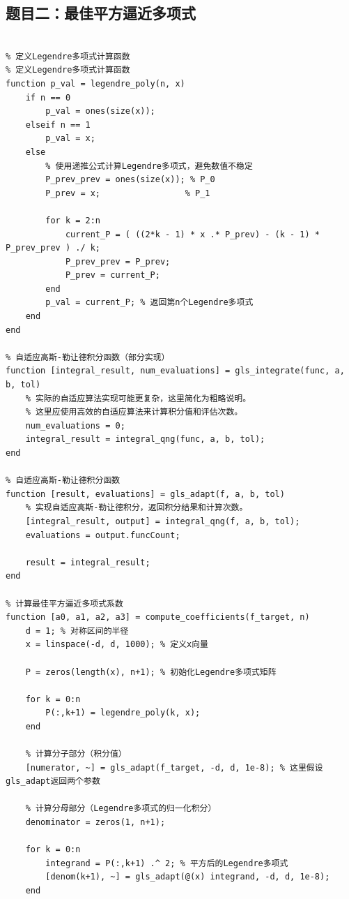 \documentclass[UTF8,a4paper,11pt]{article}
\begin{document}
\subsection{题目二：最佳平方逼近多项式}
\begin{lstlisting}[style=matlab, caption={最佳平方逼近多项式}]

% 定义Legendre多项式计算函数
% 定义Legendre多项式计算函数
function p_val = legendre_poly(n, x)
    if n == 0
        p_val = ones(size(x));
    elseif n == 1
        p_val = x;
    else
        % 使用递推公式计算Legendre多项式，避免数值不稳定
        P_prev_prev = ones(size(x)); % P_0
        P_prev = x;                 % P_1
        
        for k = 2:n
            current_P = ( ((2*k - 1) * x .* P_prev) - (k - 1) * P_prev_prev ) ./ k;
            P_prev_prev = P_prev;
            P_prev = current_P;
        end
        p_val = current_P; % 返回第n个Legendre多项式
    end
end

% 自适应高斯-勒让德积分函数（部分实现）
function [integral_result, num_evaluations] = gls_integrate(func, a, b, tol)
    % 实际的自适应算法实现可能更复杂，这里简化为粗略说明。
    % 这里应使用高效的自适应算法来计算积分值和评估次数。
    num_evaluations = 0;
    integral_result = integral_qng(func, a, b, tol);
end

% 自适应高斯-勒让德积分函数
function [result, evaluations] = gls_adapt(f, a, b, tol)
    % 实现自适应高斯-勒让德积分，返回积分结果和计算次数。
    [integral_result, output] = integral_qng(f, a, b, tol);
    evaluations = output.funcCount;
    
    result = integral_result;
end

% 计算最佳平方逼近多项式系数
function [a0, a1, a2, a3] = compute_coefficients(f_target, n)
    d = 1; % 对称区间的半径
    x = linspace(-d, d, 1000); % 定义x向量
    
    P = zeros(length(x), n+1); % 初始化Legendre多项式矩阵
    
    for k = 0:n
        P(:,k+1) = legendre_poly(k, x);
    end

    % 计算分子部分（积分值）
    [numerator, ~] = gls_adapt(f_target, -d, d, 1e-8); % 这里假设gls_adapt返回两个参数
    
    % 计算分母部分（Legendre多项式的归一化积分）
    denominator = zeros(1, n+1);
    
    for k = 0:n
        integrand = P(:,k+1) .^ 2; % 平方后的Legendre多项式
        [denom(k+1), ~] = gls_adapt(@(x) integrand, -d, d, 1e-8);
    end
    

\end{lstlisting}
\end{document}
